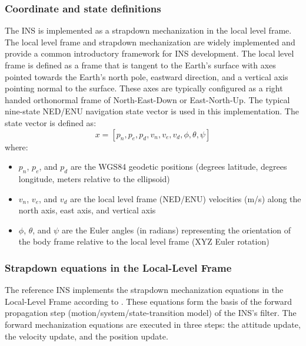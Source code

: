 \documentclass[sageh,times]{sagej}
\begin{document}
\subsubsection{Coordinate and state definitions}
The INS is implemented as a strapdown mechanization in the local level frame. The local level frame and strapdown mechanization are widely implemented and provide a common introductory framework for INS development. The local level frame is defined as a frame that is tangent to the Earth's surface with axes pointed towards the Earth's north pole, eastward direction, and a vertical axis pointing normal to the surface. These axes are typically configured as a right handed orthonormal frame of North-East-Down or East-North-Up. The typical nine-state NED/ENU navigation state vector is used in this implementation. The state vector is defined as:
\[
x = \left[p_n, p_e, p_d, v_n, v_e, v_d, \phi, \theta, \psi \right] 
\]
where: \begin{itemize}
  \item \(p_n\), \(p_e\), and \(p_d\) are the WGS84 geodetic positions (degrees latitude, degrees longitude, meters relative to the ellipsoid)
  \item \(v_n\), \(v_e\), and \(v_d\) are the local level frame (NED/ENU) velocities (m/s) along the north axis, east axis, and vertical axis 
  \item \(\phi\), \(\theta\), and \(\psi\) are the Euler angles (in radians) representing the orientation of the body frame relative to the local level frame (XYZ Euler rotation)
\end{itemize}

\subsubsection{Strapdown equations in the Local-Level Frame}
The reference INS implements the strapdown mechanization equations in the Local-Level Frame according to \cite{groves}. These equations form the basis of the forward propagation step (motion/system/state-transition model) of the INS's filter. The forward mechanization equations are executed in three steps: the attitude update, the velocity update, and the position update. 
\end{document}
